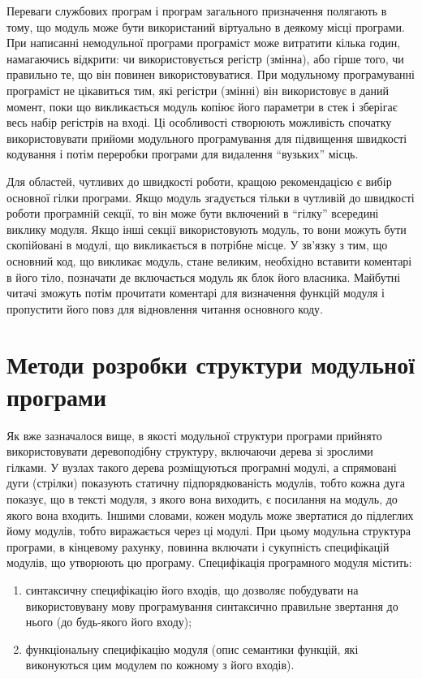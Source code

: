 \documentclass[a4paper,14pt, titlepage]{article}
\begin{document}
Переваги службових програм і програм загального призначення полягають в
тому, що модуль може бути використаний віртуально в деякому місці
програми. При написанні немодульної програми програміст може витратити
кілька годин, намагаючись відкрити: чи використовується регістр
(змінна), або гірше того, чи правильно те, що він повинен
використовуватися. При модульному програмуванні програміст не цікавиться
тим, які регістри (змінні) він використовує в даний момент, поки що
викликається модуль копіює його параметри в стек і зберігає весь набір
регістрів на вході. Ці особливості створюють можливість спочатку
використовувати прийоми модульного програмування для підвищення
швидкості кодування і потім переробки програми для видалення ``вузьких''
місць.

Для областей, чутливих до швидкості роботи, кращою рекомендацією є вибір
основної гілки програми. Якщо модуль згадується тільки в чутливій до
швидкості роботи програмній секції, то він може бути включений в
``гілку'' всередині виклику модуля. Якщо інші секції використовують
модуль, то вони можуть бути скопійовані в модулі, що викликається в потрібне
місце. У зв'язку з тим, що основний код, що викликає модуль, стане великим,
необхідно вставити коментарі в його тіло, позначати де включається модуль
як блок його власника. Майбутні читачі зможуть потім прочитати коментарі
для визначення функцій модуля і пропустити його повз для відновлення
читання основного коду.

\section{Методи розробки структури модульної програми}

Як вже зазначалося вище, в якості модульної структури програми прийнято
використовувати деревоподібну структуру, включаючи дерева зі зрослими
гілками. У вузлах такого дерева розміщуються програмні модулі, а
спрямовані дуги (стрілки) показують статичну підпорядкованість модулів,
тобто кожна дуга показує, що в тексті модуля, з якого вона виходить, є
посилання на модуль, до якого вона входить. Іншими словами, кожен модуль
може звертатися до підлеглих йому модулів, тобто виражається через ці
модулі. При цьому модульна структура програми, в кінцевому рахунку,
повинна включати і сукупність специфікацій модулів, що утворюють цю
програму. Специфікація програмного модуля містить:
\begin{enumerate}
    \item синтаксичну
    специфікацію його входів, що дозволяє побудувати на використовувану мову
    програмування синтаксично правильне звертання до нього (до будь-якого
    його входу);
    \item функціональну специфікацію модуля (опис семантики
    функцій, які виконуються цим модулем по кожному з його входів).
\end{enumerate}
\end{document}
